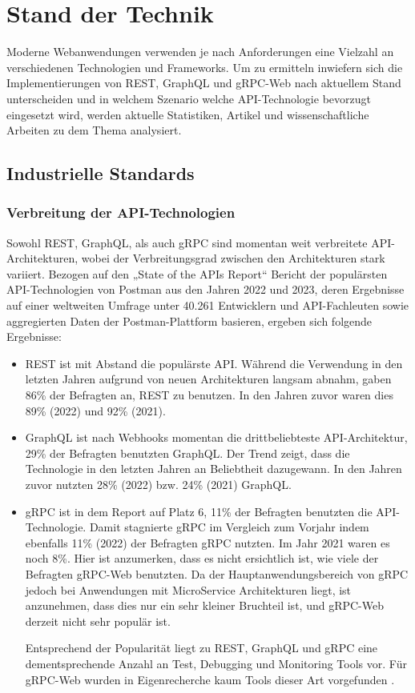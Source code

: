 \chapter{Stand der Technik}
\label{chap:intro}

Moderne Webanwendungen verwenden je nach Anforderungen eine Vielzahl an verschiedenen Technologien und Frameworks. Um zu ermitteln inwiefern sich die Implementierungen von REST, GraphQL und gRPC-Web nach aktuellem Stand unterscheiden und in welchem Szenario welche API-Technologie bevorzugt eingesetzt wird, werden aktuelle Statistiken, Artikel und wissenschaftliche Arbeiten zu dem Thema analysiert.

\chapterstart
\section{Industrielle Standards}
\subsection{Verbreitung der API-Technologien}
Sowohl REST, GraphQL, als auch gRPC sind momentan weit verbreitete API-Architekturen, wobei der Verbreitungsgrad zwischen den Architekturen stark variiert. Bezogen auf den „State of the APIs Report“ Bericht der populärsten API-Technologien von Postman aus den Jahren 2022 und 2023, deren Ergebnisse auf einer weltweiten Umfrage unter 40.261 Entwicklern und API-Fachleuten sowie aggregierten Daten der Postman-Plattform basieren, ergeben sich folgende Ergebnisse:

\begin{itemize}
	\item REST ist mit Abstand die populärste API. Während die Verwendung in den letzten Jahren aufgrund von neuen Architekturen langsam abnahm, gaben 86\% der Befragten an, REST zu benutzen. In den Jahren zuvor waren dies 89\% (2022) und 92\% (2021).
	\item GraphQL ist nach Webhooks momentan die drittbeliebteste API-Architektur, 29\% der Befragten benutzten GraphQL. Der Trend zeigt, dass die Technologie in den letzten Jahren an Beliebtheit dazugewann. In den Jahren zuvor nutzten 28\% (2022) bzw. 24\% (2021) GraphQL.
	\item gRPC ist in dem Report auf Platz 6, 11\% der Befragten benutzten die API-Technologie. Damit stagnierte gRPC im Vergleich zum Vorjahr indem ebenfalls 11\% (2022) der Befragten gRPC nutzten. Im Jahr 2021 waren es noch 8\%. Hier ist anzumerken, dass es nicht ersichtlich ist, wie viele der Befragten gRPC-Web benutzten. Da der Hauptanwendungsbereich von gRPC jedoch bei Anwendungen mit MicroService Architekturen liegt, ist anzunehmen, dass dies nur ein sehr kleiner Bruchteil ist, und gRPC-Web derzeit nicht sehr populär ist.
	
	Entsprechend der Popularität liegt zu REST, GraphQL und gRPC eine dementsprechende Anzahl an Test, Debugging und Monitoring Tools vor. Für gRPC-Web wurden in Eigenrecherche kaum Tools dieser Art vorgefunden \parencite{postman2022, postman2023}.
\end{itemize}

